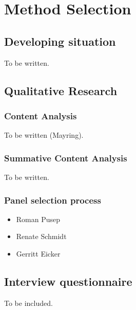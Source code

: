%
%

\pagebreak
\section{Method Selection}

\onehalfspacing

\subsection{Developing situation}

To be written.

\subsection{Qualitative Research}

\subsubsection{Content Analysis}

To be written (Mayring).

\subsubsection{Summative Content Analysis} 

To be written.

\subsubsection{Panel selection process}

\begin{itemize}
 \item Roman Pusep
 \item Renate Schmidt
 \item Gerritt Eicker
\end{itemize}

\subsection{Interview questionnaire}

To be included.
